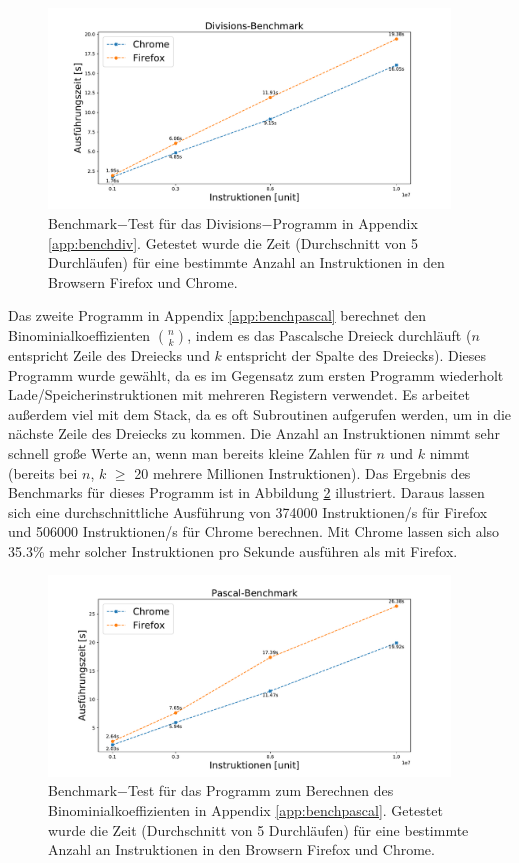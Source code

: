 \documentclass[a4paper, 11pt, onecolumn]{article}
\begin{document}
\begin{figure}[!htb]
    \centering  
    \includegraphics[width=0.95\textwidth]{data/divisionBenchmark}
    \caption{Benchmark$-$Test für das Divisions$-$Programm in Appendix \ref{app:benchdiv}. Getestet wurde die Zeit (Durchschnitt von 5 Durchläufen) für eine bestimmte Anzahl an Instruktionen in den Browsern Firefox und Chrome.}
    \label{fig:benchmarkDiv}
\end{figure}

Das zweite Programm in Appendix \ref{app:benchpascal} berechnet den Binominialkoeffizienten ${n}\choose{k}$, indem es das Pascalsche Dreieck durchläuft ($n$ entspricht Zeile des Dreiecks und $k$ entspricht der Spalte des Dreiecks). Dieses Programm wurde gewählt, da es im Gegensatz zum ersten Programm wiederholt Lade/Speicherinstruktionen mit mehreren Registern verwendet. Es arbeitet außerdem viel mit dem Stack, da es oft Subroutinen aufgerufen werden, um in die nächste Zeile des Dreiecks zu kommen. Die Anzahl an Instruktionen nimmt sehr schnell große Werte an, wenn man bereits kleine Zahlen für $n$ und $k$ nimmt (bereits bei $n$, $k$ $\geq$ 20 mehrere Millionen Instruktionen). Das Ergebnis des Benchmarks für dieses Programm ist in Abbildung \ref{fig:benchmarkPascal} illustriert. Daraus lassen sich eine durchschnittliche Ausführung von 374000 Instruktionen/s für Firefox und 506000 Instruktionen/s für Chrome berechnen. Mit Chrome lassen sich also 35.3\% mehr solcher Instruktionen pro Sekunde ausführen als mit Firefox.

\begin{figure}[!htb]
    \centering  
    \includegraphics[width=0.95\textwidth]{data/pascalBenchmark}
    \caption{Benchmark$-$Test für das Programm zum Berechnen des Binominialkoeffizienten in Appendix \ref{app:benchpascal}. Getestet wurde die Zeit (Durchschnitt von 5 Durchläufen) für eine bestimmte Anzahl an Instruktionen in den Browsern Firefox und Chrome.}
    \label{fig:benchmarkPascal}
\end{figure}
\end{document}
